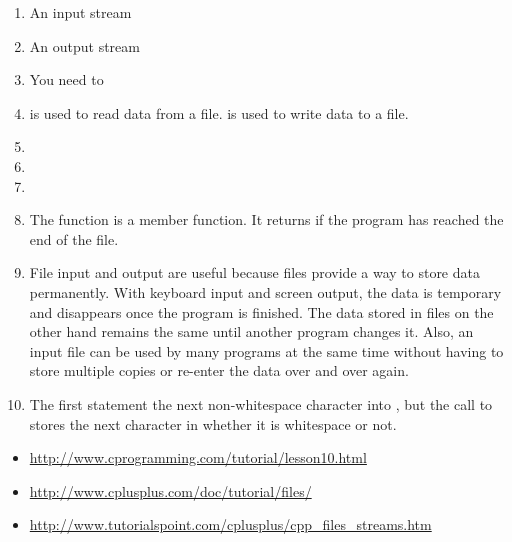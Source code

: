 \begin{enumerate}
\item An input stream
\item An output stream
\item You need to 
\item {} is used to read data from a file.  is used to write data to a file.
\item {}

\item {}
\item {}
\item The  function is a member function. It returns  if the program has reached the end of the file.
\item File input and output are useful because files provide a way to store data permanently. With keyboard input and screen output, the data is temporary and disappears once the program is finished. The data stored in files on the other hand remains the same until another program changes it. Also, an input file can be used by many programs at the same time without having to store multiple copies or re-enter the data over and over again.
\item The first  statement the next non-whitespace character into , but the call to  stores the next character in  whether it is whitespace or not.
\end{enumerate}


\begin{itemize}
\item \url{http://www.cprogramming.com/tutorial/lesson10.html}
\item \url{http://www.cplusplus.com/doc/tutorial/files/}
\item \url{http://www.tutorialspoint.com/cplusplus/cpp_files_streams.htm}
\end{itemize}	

